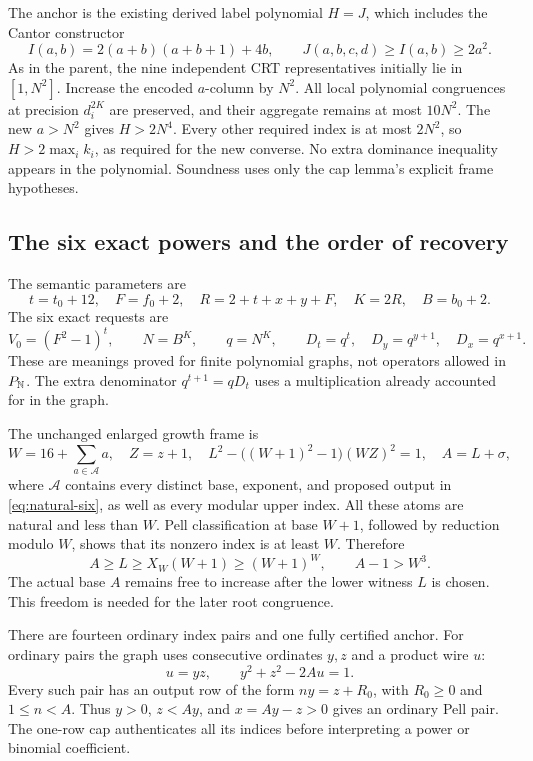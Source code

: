 The anchor is the existing derived label polynomial \(H=J\), which
includes the Cantor constructor
\[
 I(a,b)=2(a+b)(a+b+1)+4b,
 \qquad J(a,b,c,d)\ge I(a,b)\ge2a^2.
\]
As in the parent, the nine independent CRT representatives initially
lie in \([1,N^2]\). Increase the encoded \(a\)-column by \(N^2\).
All local polynomial congruences at precision \(d_i^{2K}\) are
preserved, and their aggregate remains at most \(10N^2\).
The new \(a>N^2\) gives \(H>2N^4\). Every other required index
is at most \(2N^2\), so \(H>2\max_i k_i\), as required for the
new converse. No extra dominance inequality appears in the polynomial.
Soundness uses only the cap lemma's explicit frame hypotheses.

\subsection{The six exact powers and the order of recovery}

The semantic parameters are
\[
 t=t_0+12,\quad F=f_0+2,\quad
 R=2+t+x+y+F,\quad K=2R,\quad B=b_0+2.
\]
The six exact requests are
\begin{equation}\label{eq:natural-six}
 V_0=(F^2-1)^t,\qquad N=B^K,\qquad q=N^K,\qquad
 D_t=q^t,\quad D_y=q^{y+1},\quad D_x=q^{x+1}.
\end{equation}
These are meanings proved for finite polynomial graphs, not operators
allowed in \(P_{\mathbb N}\). The extra denominator \(q^{t+1}=qD_t\)
uses a multiplication already accounted for in the graph.

The unchanged enlarged growth frame is
\[
 W=16+\sum_{a\in\mathcal A}a,\quad Z=z+1,\quad
 L^2-\big((W+1)^2-1\big)(WZ)^2=1,\quad A=L+\sigma,
\]
where \(\mathcal A\) contains every distinct base, exponent, and
proposed output in \eqref{eq:natural-six}, as well as every modular
upper index. All these atoms are natural and less than \(W\).
Pell classification at base \(W+1\), followed by reduction modulo
\(W\), shows that its nonzero index is at least \(W\). Therefore
\[
 A\ge L\ge X_W(W+1)\ge(W+1)^W,
 \qquad A-1>W^3.
\]
The actual base \(A\) remains free to increase after the lower witness
\(L\) is chosen. This freedom is needed for the later root congruence.

There are fourteen ordinary index pairs and one fully certified
anchor. For ordinary pairs the graph uses consecutive ordinates
\(y,z\) and a product wire \(u\):
\[
 u=yz,\qquad y^2+z^2-2Au=1.
\]
Every such pair has an output row of the form
\(ny=z+R_0\), with \(R_0\ge0\) and \(1\le n<A\).
Thus \(y>0\), \(z<Ay\), and \(x=Ay-z>0\) gives an ordinary
Pell pair. The one-row cap authenticates all its indices before
interpreting a power or binomial coefficient.

